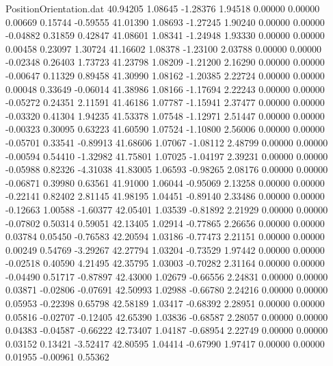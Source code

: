 \begin{filecontents}{PositionOrientation.dat}
  40.94205    1.08645   -1.28376     1.94518    0.00000    0.00000    0.00669    0.15744   -0.59555
  41.01390    1.08693   -1.27245     1.90240    0.00000    0.00000   -0.04882    0.31859    0.42847
  41.08601    1.08341   -1.24948     1.93330    0.00000    0.00000    0.00458    0.23097    1.30724
  41.16602    1.08378   -1.23100     2.03788    0.00000    0.00000   -0.02348    0.26403    1.73723
  41.23798    1.08209   -1.21200     2.16290    0.00000    0.00000   -0.00647    0.11329    0.89458
  41.30990    1.08162   -1.20385     2.22724    0.00000    0.00000    0.00048    0.33649   -0.06014
  41.38986    1.08166   -1.17694     2.22243    0.00000    0.00000   -0.05272    0.24351    2.11591
  41.46186    1.07787   -1.15941     2.37477    0.00000    0.00000   -0.03320    0.41304    1.94235
  41.53378    1.07548   -1.12971     2.51447    0.00000    0.00000   -0.00323    0.30095    0.63223
  41.60590    1.07524   -1.10800     2.56006    0.00000    0.00000   -0.05701    0.33541   -0.89913
  41.68606    1.07067   -1.08112     2.48799    0.00000    0.00000   -0.00594    0.54410   -1.32982
  41.75801    1.07025   -1.04197     2.39231    0.00000    0.00000   -0.05988    0.82326   -4.31038
  41.83005    1.06593   -0.98265     2.08176    0.00000    0.00000   -0.06871    0.39980    0.63561
  41.91000    1.06044   -0.95069     2.13258    0.00000    0.00000   -0.22141    0.82402    2.81145
  41.98195    1.04451   -0.89140     2.33486    0.00000    0.00000   -0.12663    1.00588   -1.60377
  42.05401    1.03539   -0.81892     2.21929    0.00000    0.00000   -0.07802    0.50314    0.59051
  42.13405    1.02914   -0.77865     2.26656    0.00000    0.00000    0.03784    0.05450   -0.76583
  42.20594    1.03186   -0.77473     2.21151    0.00000    0.00000    0.00249    0.54769   -3.29267
  42.27794    1.03204   -0.73529     1.97442    0.00000    0.00000   -0.02518    0.40590    4.21495
  42.35795    1.03003   -0.70282     2.31164    0.00000    0.00000   -0.04490    0.51717   -0.87897
  42.43000    1.02679   -0.66556     2.24831    0.00000    0.00000    0.03871   -0.02806   -0.07691
  42.50993    1.02988   -0.66780     2.24216    0.00000    0.00000    0.05953   -0.22398    0.65798
  42.58189    1.03417   -0.68392     2.28951    0.00000    0.00000    0.05816   -0.02707   -0.12405
  42.65390    1.03836   -0.68587     2.28057    0.00000    0.00000    0.04383   -0.04587   -0.66222
  42.73407    1.04187   -0.68954     2.22749    0.00000    0.00000    0.03152    0.13421   -3.52417
  42.80595    1.04414   -0.67990     1.97417    0.00000    0.00000    0.01955   -0.00961    0.55362

\end{filecontents}

